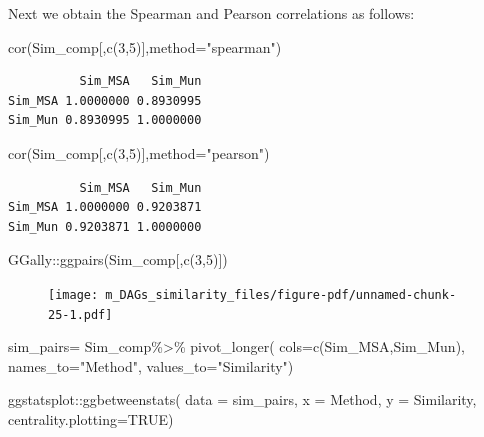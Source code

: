 \documentclass[
  letterpaper,
  DIV=11,
  numbers=noendperiod]{scrreprt}
\newenvironment{Shaded}{}{}
\newcommand{\AttributeTok}[1]{\textcolor[rgb]{0.78,0.47,0.87}{#1}}
\newcommand{\ConstantTok}[1]{\textcolor[rgb]{0.82,0.60,0.40}{#1}}
\newcommand{\DecValTok}[1]{\textcolor[rgb]{0.82,0.60,0.40}{#1}}
\newcommand{\FunctionTok}[1]{\textcolor[rgb]{0.38,0.69,0.94}{#1}}
\newcommand{\NormalTok}[1]{\textcolor[rgb]{0.67,0.70,0.75}{#1}}
\newcommand{\OtherTok}[1]{\textcolor[rgb]{0.15,0.68,0.38}{#1}}
\newcommand{\SpecialCharTok}[1]{\textcolor[rgb]{0.34,0.71,0.76}{#1}}
\newcommand{\StringTok}[1]{\textcolor[rgb]{0.60,0.76,0.47}{#1}}
\begin{document}
Next we obtain the Spearman and Pearson correlations as follows:

\begin{Shaded}
\begin{Highlighting}[]
\FunctionTok{cor}\NormalTok{(Sim\_comp[,}\FunctionTok{c}\NormalTok{(}\DecValTok{3}\NormalTok{,}\DecValTok{5}\NormalTok{)],}\AttributeTok{method=}\StringTok{"spearman"}\NormalTok{)}
\end{Highlighting}
\end{Shaded}

\begin{verbatim}
          Sim_MSA   Sim_Mun
Sim_MSA 1.0000000 0.8930995
Sim_Mun 0.8930995 1.0000000
\end{verbatim}

\begin{Shaded}
\begin{Highlighting}[]
\FunctionTok{cor}\NormalTok{(Sim\_comp[,}\FunctionTok{c}\NormalTok{(}\DecValTok{3}\NormalTok{,}\DecValTok{5}\NormalTok{)],}\AttributeTok{method=}\StringTok{"pearson"}\NormalTok{)}
\end{Highlighting}
\end{Shaded}

\begin{verbatim}
          Sim_MSA   Sim_Mun
Sim_MSA 1.0000000 0.9203871
Sim_Mun 0.9203871 1.0000000
\end{verbatim}

\begin{Shaded}
\begin{Highlighting}[]
\NormalTok{GGally}\SpecialCharTok{::}\FunctionTok{ggpairs}\NormalTok{(Sim\_comp[,}\FunctionTok{c}\NormalTok{(}\DecValTok{3}\NormalTok{,}\DecValTok{5}\NormalTok{)])}
\end{Highlighting}
\end{Shaded}

\begin{figure}[H]

{\centering \texttt{[image: m\_DAGs\_similarity\_files/figure-pdf/unnamed-chunk-25-1.pdf]}

}

\end{figure}

\begin{Shaded}
\begin{Highlighting}[]
\NormalTok{sim\_pairs}\OtherTok{=}\NormalTok{ Sim\_comp}\SpecialCharTok{\%\textgreater{}\%} \FunctionTok{pivot\_longer}\NormalTok{(}
  \AttributeTok{cols=}\FunctionTok{c}\NormalTok{(Sim\_MSA,Sim\_Mun),}
  \AttributeTok{names\_to=}\StringTok{"Method"}\NormalTok{,}
  \AttributeTok{values\_to=}\StringTok{"Similarity"}\NormalTok{)}

\NormalTok{ggstatsplot}\SpecialCharTok{::}\FunctionTok{ggbetweenstats}\NormalTok{(}
  \AttributeTok{data =}\NormalTok{ sim\_pairs,}
  \AttributeTok{x =}\NormalTok{ Method,}
  \AttributeTok{y =}\NormalTok{ Similarity,}
  \AttributeTok{centrality.plotting=}\ConstantTok{TRUE}\NormalTok{)}
\end{Highlighting}
\end{Shaded}
\end{document}
